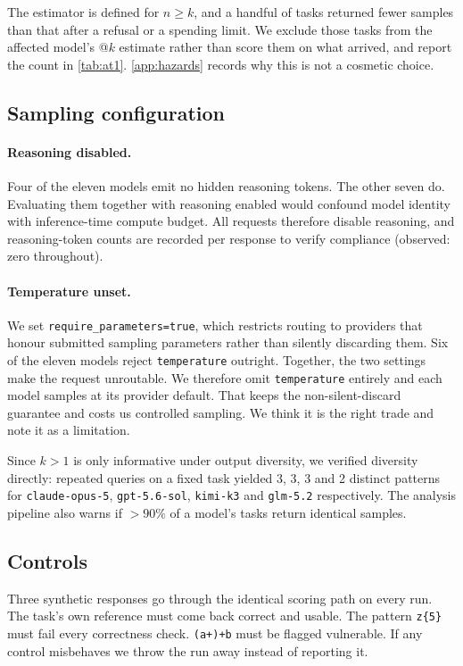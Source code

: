 \documentclass[11pt]{article}
\begin{document}
The estimator is defined for $n \geq k$, and a handful of tasks returned fewer
samples than that after a refusal or a spending limit. We exclude those tasks
from the affected model's @$k$ estimate rather than score them on what
arrived, and report the count in \cref{tab:at1}. \cref{app:hazards} records
why this is not a cosmetic choice.

\subsection{Sampling configuration}
\label{sec:sampling}

\paragraph{Reasoning disabled.} Four of the eleven models emit no hidden
reasoning tokens. The other seven do. Evaluating them together with reasoning enabled
would confound model identity with inference-time compute budget. All
requests therefore disable reasoning, and reasoning-token counts are recorded
per response to verify compliance (observed: zero throughout).

\paragraph{Temperature unset.} We set
\texttt{require\_parameters=true}, which restricts routing to providers that
honour submitted sampling parameters rather than silently discarding them.
Six of the eleven models reject \texttt{temperature} outright. Together, the
two settings make the request unroutable. We therefore omit
\texttt{temperature} entirely and
each model samples at its provider default. That keeps the non-silent-discard
guarantee and costs us controlled
sampling. We think it is the right trade and note it as a limitation.

Since $k>1$ is only informative under output diversity, we verified diversity
directly: repeated queries on a fixed task yielded 3, 3, 3 and 2 distinct
patterns for \texttt{claude-opus-5}, \texttt{gpt-5.6-sol}, \texttt{kimi-k3}
and \texttt{glm-5.2} respectively. The analysis pipeline also warns
if $>90\%$ of a model's tasks return identical samples.

\subsection{Controls}

Three synthetic responses go through the identical scoring path on every run.
The task's own reference must come back correct and usable. The pattern
\texttt{z\{5\}} must fail every correctness check. \texttt{(a+)+b} must be
flagged vulnerable. If any control misbehaves we throw the run away instead of
reporting it.
\end{document}
